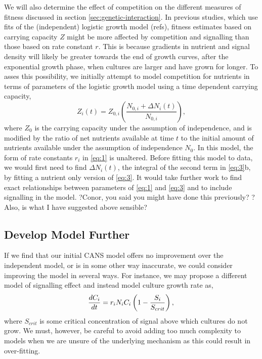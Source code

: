 We will also determine the effect of competition on the different
measures of fitness discussed in section
\ref{sec:genetic-interaction}. In previous studies, which use fits of
the (independent) logistic growth model (refs), fitness estimates
based on carrying capacity \(Z\) might be more affected by competition
and signalling than those based on rate constant \(r\). This is
because gradients in nutrient and signal density will likely be
greater towards the end of growth curves, after the exponential growth
phase, when cultures are larger and have grown for longer. To asses
this possibility, we initially attempt to model competition for
nutrients in terms of parameters of the logistic growth model using a
time dependent carrying capacity,
\begin{equation}
  \label{eq:5}
  Z_{i}(t) = Z_{0,i}\left(\frac{N_{0,i} + \Delta N_{i}(t)}{N_{0,i}}\right),
\end{equation}
where \(Z_{0}\) is the carrying capacity under the assumption of
independence, and is modified by the ratio of net nutrients available
at time \(t\) to the initial amount of nutrients available under the
assumption of independence \(N_{0}\). In this model, the form of rate
constants \(r_{i}\) in \ref{eq:1} is unaltered. Before fitting this
model to data, we would first need to find \(\Delta N_{i}(t)\), the
integral of the second term in \ref{eq:3}b, by fitting a nutrient only
version of \ref{eq:3}. It would take further work to find exact
relationships between parameters of \ref{eq:1} and \ref{eq:3} and to
include signalling in the model. ?Conor,
you said you might have done this previously?  ?Also, is what I have
suggested above sensible?

\subsection{Develop Model Further}
\label{sec:dev-mod-further}
If we find that our initial CANS model offers no improvement over the
independent model, or is in some other way inaccurate, we could
consider improving the model in several ways. For instance, we may
propose a different model of signalling effect and instead model
culture growth rate as,
\begin{equation}
  \label{eq:6}
  \frac{dC_{i}}{dt} = r_{i}N_{i}C_{i}\left(1 - \frac{S_{i}}{S_{crit}}\right),\\
\end{equation}
where \(S_{crit}\) is some critical concentration of signal above
which cultures do not grow. We must, however, be careful to avoid
adding too much complexity to models when we are unsure of the
underlying mechanism as this could result in over-fitting.


